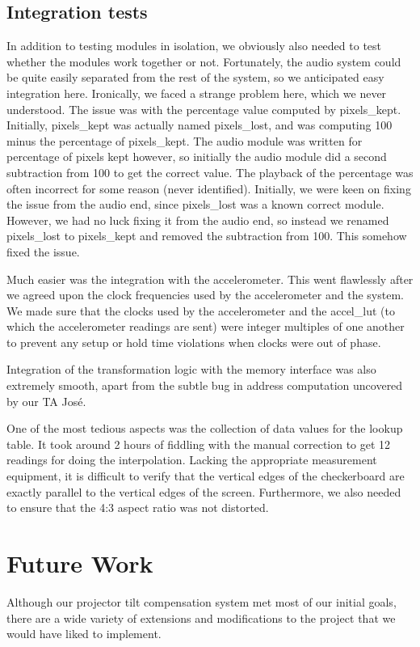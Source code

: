 \documentclass{article}
\begin{document}
\subsection{Integration tests}
In addition to testing modules in isolation, we obviously also needed to test whether the modules work together or not.
Fortunately, the audio system could be quite easily separated from the rest of the system, so we anticipated easy integration here.
Ironically, we faced a strange problem here, which we never understood.
The issue was with the percentage value computed by pixels\_kept.
Initially, pixels\_kept was actually named pixels\_lost, and was computing 100 minus the percentage of pixels\_kept.
The audio module was written for percentage of pixels kept however,
so initially the audio module did a second subtraction from 100 to get the correct value.
The playback of the percentage was often incorrect for some reason (never identified).
Initially, we were keen on fixing the issue from the audio end, since pixels\_lost was a known correct module.
However, we had no luck fixing it from the audio end, so instead we renamed pixels\_lost to pixels\_kept and removed the subtraction from 100.
This somehow fixed the issue.

Much easier was the integration with the accelerometer.
This went flawlessly after we agreed upon the clock frequencies used by the accelerometer and the system. We made sure that the clocks used by the accelerometer and the accel\_lut (to which the accelerometer readings are sent) were integer multiples of one another to prevent any setup or hold time violations when clocks were out of phase.

Integration of the transformation logic with the memory interface was also extremely smooth,
apart from the subtle bug in address computation uncovered by our TA Jos\'{e}.

One of the most tedious aspects was the collection of data values for the lookup table.
It took around 2 hours of fiddling with the manual correction to get 12 readings for doing the interpolation.
Lacking the appropriate measurement equipment,
it is difficult to verify that the vertical edges of the checkerboard are exactly parallel to the vertical edges of the screen.
Furthermore, we also needed to ensure that the 4:3 aspect ratio was not distorted.

\section{Future Work}
Although our projector tilt compensation system met most of our initial goals,
there are a wide variety of extensions and modifications to the project that we would have liked to implement.
\end{document}
